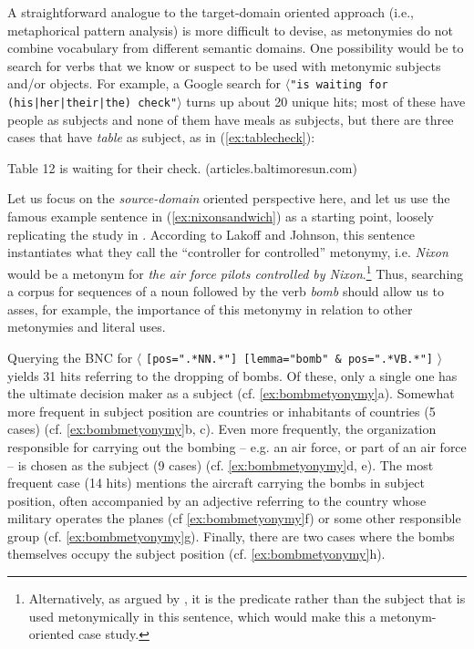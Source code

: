 A straightforward analogue to the target\hyp{}domain oriented approach (i.e., metaphorical  pattern analysis)  is more difficult to devise, as metonymies  do not combine vocabulary from different semantic  domains. One possibility would be to search for verbs  that we know or suspect to be used with metonymic subjects and\slash or objects. For example, a Google search for $\langle$\texttt{"is waiting for (his|her|\linebreak their|the) check"}$\rangle$ turns up about 20 unique hits; most of these have people as subjects and none of them have meals as subjects, but there are three cases that have \textit{table} as subject, as in (\ref{ex:tablecheck}):

\begin{exe}
\ex Table 12 is waiting for their check. (articles.baltimoresun.com)
\label{ex:tablecheck}
\end{exe}

Let us focus on the \textit{source\hyp{}domain} oriented perspective here, and let us use the famous example sentence in (\ref{ex:nixonsandwich}) as a starting point, loosely replicating  the study in \citet{stefanowitsch_metonymies_2015}. According to Lakoff and Johnson, this sentence instantiates what they call the ``controller for controlled'' metonymy,  i.e. \textit{Nixon} would be a metonym for \textit{the air force pilots controlled by Nixon}.\footnote{Alternatively, as argued by \citet{stallard_two_1993}, it is the predicate rather than the subject that is used metonymically  in this sentence, which would make this a metonym\hyp{}oriented case study.} Thus, searching a corpus for sequences of a noun  followed by the verb  \textit{bomb} should allow us to asses, for example, the importance of this metonymy  in relation to other metonymies and literal  uses.

Querying the BNC  for $\langle$ \texttt{[pos=".*NN.*"] [lemma="bomb" \& pos=".*VB.*"]} $\rangle$ yields 31 hits referring to the dropping of bombs. Of these, only a single one has the ultimate decision maker as a subject (cf. \ref{ex:bombmetyonymy}a). Somewhat more frequent in subject position are countries or inhabitants of countries (5 cases) (cf. \ref{ex:bombmetyonymy}b, c). Even more frequently, the organization responsible for carrying out the bombing -- e.g. an air force, or part of an air force -- is chosen as the subject (9 cases) (cf. \ref{ex:bombmetyonymy}d, e). The most frequent case (14 hits) mentions the aircraft carrying the bombs in subject position, often accompanied by an adjective  referring to the country whose military operates the planes (cf \ref{ex:bombmetyonymy}f) or some other responsible group (cf. \ref{ex:bombmetyonymy}g). Finally, there are two cases where the bombs themselves occupy the subject position (cf. \ref{ex:bombmetyonymy}h).


